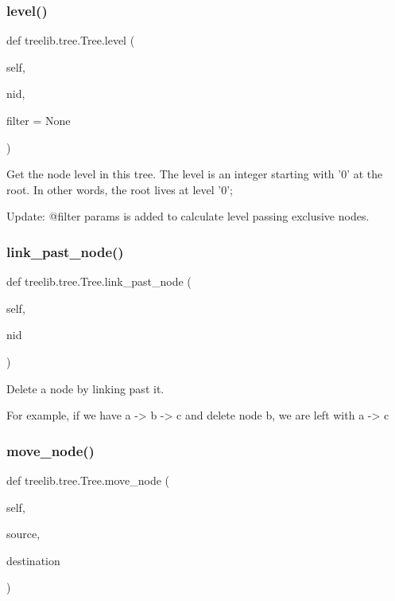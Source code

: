 \subsubsection{\texorpdfstring{level()}{level()}}
{\footnotesize\ttfamily def treelib.\+tree.\+Tree.\+level (\begin{DoxyParamCaption}\item[{}]{self,  }\item[{}]{nid,  }\item[{}]{filter = {\ttfamily None} }\end{DoxyParamCaption})}

\begin{DoxyVerb}Get the node level in this tree.
The level is an integer starting with '0' at the root.
In other words, the root lives at level '0';

Update: @filter params is added to calculate level passing
exclusive nodes.
\end{DoxyVerb}
 \mbox{\label{classtreelib_1_1tree_1_1Tree_a8f9e29d59e9ec0b689d9321c7c2358a7}} 
\subsubsection{\texorpdfstring{link\+\_\+past\+\_\+node()}{link\_past\_node()}}
{\footnotesize\ttfamily def treelib.\+tree.\+Tree.\+link\+\_\+past\+\_\+node (\begin{DoxyParamCaption}\item[{}]{self,  }\item[{}]{nid }\end{DoxyParamCaption})}

\begin{DoxyVerb}Delete a node by linking past it.

For example, if we have a -> b -> c and delete node b, we are left
with a -> c
\end{DoxyVerb}
 \mbox{\label{classtreelib_1_1tree_1_1Tree_a4ce0af34154a2903c4692eb195e114b9}} 
\subsubsection{\texorpdfstring{move\+\_\+node()}{move\_node()}}
{\footnotesize\ttfamily def treelib.\+tree.\+Tree.\+move\+\_\+node (\begin{DoxyParamCaption}\item[{}]{self,  }\item[{}]{source,  }\item[{}]{destination }\end{DoxyParamCaption})}

